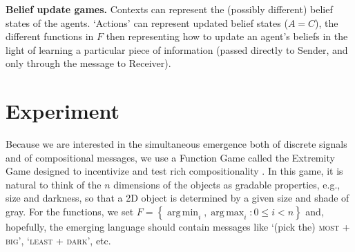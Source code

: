 \documentclass[11pt,a4paper]{article}
\DeclareMathOperator*{\argmax}{arg\,max}
\DeclareMathOperator*{\argmin}{arg\,min}
\newcommand{\nbSST}[1]{{\leavevmode\color{violet}{\scriptsize#1}}}
\begin{document}
\noindent \textbf{Belief update games.} Contexts can represent the (possibly different) belief states of the agents. `Actions' can represent updated belief states ($A = C$), the different functions in $F$ then representing how to update an agent's beliefs in the light of learning a particular piece of information (passed directly to Sender, and only through the message to Receiver). 
\nbSST{What should we cite here? Something from dynamic semantics?}


\section{Experiment}

Because we are interested in the simultaneous emergence both of discrete signals and of compositional messages, we use a Function Game called the Extremity Game designed to incentivize and test rich compositionality \citep{Steinert-Threlkeld2019}. In this game, it is natural to think of the $n$ dimensions of the objects as gradable properties, e.g., size and darkness, so that a 2D object is determined by a given size and shade of gray. For the functions, we set $F = \left\{ \argmin_i , \argmax_i : 0 \leq i < n \right\}$ and, hopefully, the emerging language should contain messages like `(pick the) \textsc{most} + \textsc{big}', `\textsc{least} + \textsc{dark}', etc.


\end{document}
